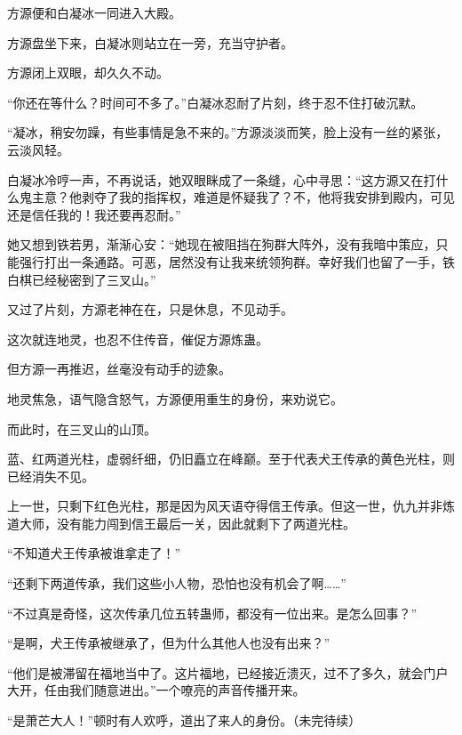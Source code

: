 \begin{this_body}
方源便和白凝冰一同进入大殿。

方源盘坐下来，白凝冰则站立在一旁，充当守护者。

方源闭上双眼，却久久不动。

“你还在等什么？时间可不多了。”白凝冰忍耐了片刻，终于忍不住打破沉默。

“凝冰，稍安勿躁，有些事情是急不来的。”方源淡淡而笑，脸上没有一丝的紧张，云淡风轻。

白凝冰冷哼一声，不再说话，她双眼眯成了一条缝，心中寻思：“这方源又在打什么鬼主意？他剥夺了我的指挥权，难道是怀疑我了？不，他将我安排到殿内，可见还是信任我的！我还要再忍耐。”

她又想到铁若男，渐渐心安：“她现在被阻挡在狗群大阵外，没有我暗中策应，只能强行打出一条通路。可恶，居然没有让我来统领狗群。幸好我们也留了一手，铁白棋已经秘密到了三叉山。”

又过了片刻，方源老神在在，只是休息，不见动手。

这次就连地灵，也忍不住传音，催促方源炼蛊。

但方源一再推迟，丝毫没有动手的迹象。

地灵焦急，语气隐含怒气，方源便用重生的身份，来劝说它。

而此时，在三叉山的山顶。

蓝、红两道光柱，虚弱纤细，仍旧矗立在峰巅。至于代表犬王传承的黄色光柱，则已经消失不见。

上一世，只剩下红色光柱，那是因为风天语夺得信王传承。但这一世，仇九并非炼道大师，没有能力闯到信王最后一关，因此就剩下了两道光柱。

“不知道犬王传承被谁拿走了！”

“还剩下两道传承，我们这些小人物，恐怕也没有机会了啊……”

“不过真是奇怪，这次传承几位五转蛊师，都没有一位出来。是怎么回事？”

“是啊，犬王传承被继承了，但为什么其他人也没有出来？”

“他们是被滞留在福地当中了。这片福地，已经接近溃灭，过不了多久，就会门户大开，任由我们随意进出。”一个嘹亮的声音传播开来。

“是萧芒大人！”顿时有人欢呼，道出了来人的身份。（未完待续）

\end{this_body}


